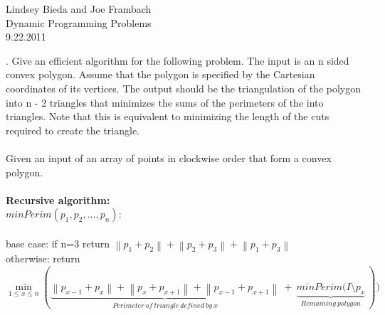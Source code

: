 \documentclass[10pt]{article}
\newcommand{\tab}{\hspace*{2em}}
\begin{document}
	\begin{flushright}
	Lindsey Bieda and Joe Frambach\\
	Dynamic Programming Problems\\
	9.22.2011
	\end{flushright}
	.  Give an efficient algorithm for the following problem. The input is an n sided convex polygon. Assume
			that the polygon is specified by the Cartesian coordinates of its vertices.  The output should be the
			triangulation of the polygon into n - 2 triangles that minimizes the sums of the perimeters of the
			into triangles. Note that this is equivalent to minimizing the length of the cuts required to create the
			triangle.\\
			\\
			Given an input of an array of points in clockwise order that form a convex polygon.\\
			\\
			\textbf{Recursive algorithm:}\\
				$minPerim(p_1,p_2,\ldots,p_n):$\\
				\\
				\tab base case: if n=3 return $\left\|p_1+p_2\right\|+\left\|p_2+p_3\right\|+\left\|p_1+p_3\right\|$\\
				\tab otherwise: return \[
				\min_{1 \leq x \leq n}(
						\underbrace{\left\|p_{x-1}+p_x\right\|+\left\|p_x+p_{x+1}\right\|+\left\|p_{x-1}+p_{x+1}\right\|}_{Perimeter~of~triangle~defined~by~x}
						~+~
						\underbrace{minPerim(I \setminus p_{x}}_{Remaining~polygon}~)
				)\]
				
\end{document}
